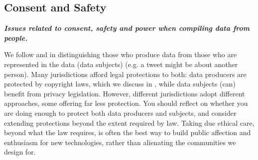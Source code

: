 



\subsection{Consent and Safety}\label{sec:whose}
\noindent\textbf{\textit{Issues related to consent, safety and power when compiling data from people.}}
\newline 


\noindent We follow \citet{havens_situated_2020} and \citet{bird_typology_2023} in distinguishing those who produce data from those who are represented in the data (data subjects) (e.g. a tweet might be about another person). Many jurisdictions afford legal protections to both: data producers are protected by copyright laws, which we discuss in , while data subjects (can) benefit from privacy legislation. However, different jurisdictions adopt different approaches, some offering far less protection. You should reflect on whether you are doing enough to protect both data producers and subjects, and consider extending protections beyond the extent required by law. Taking due ethical care, beyond what the law requires, is often the best way to build public affection and enthusiasm for new technologies, rather than alienating the communities we design for.

